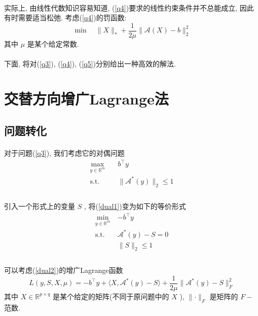 \documentclass[UTF8]{ctexart}
\newcommand{\equSplit}[1]{\begin{equation}\begin{split}#1\end{split}\end{equation}}
\newcommand{\equ}[1]{\begin{equation}#1\end{equation}}
\newcommand{\Tst}{\text{s.t.}\quad}
\newcommand{\norm}[1]{\lVert#1\rVert}
\newcommand{\inprod}[1]{\langle#1\rangle}
\newcommand{\Real}[1]{\mathbb{R}^{#1}}
\newcommand{\nunorm}{\norm{X}_*}
\newcommand{\Ma}{\mathcal{A}}
\numberwithin{equation}{section}
\begin{document}
			\paragraph{}
				\quad 实际上, 由线性代数知识容易知道, (\ref{q4})要求的线性约束条件并不总能成立, 因此有时需要适当松弛. 考虑(\ref{q4})的罚函数:
				\equ{\label{q5}
					\min \quad \nunorm+ \frac{1}{2\mu} \norm{\mathcal{A}(X) - b}_2^2
				}
				其中 $\mu$ 是某个给定常数.

			\paragraph{}
				\quad 下面, 将对(\ref{q3}), (\ref{q4}), (\ref{q5})分别给出一种高效的解法.

	\section{交替方向增广Lagrange法}
		\subsection{问题转化}
			\paragraph{}
				\quad 对于问题(\ref{q3}), 我们考虑它的对偶问题
				\equSplit{\label{dual1}
					\max_{y \in \Real{m}} \quad & b^\top y\\
					\Tst & \norm{\Ma^*(y)}_2 \le 1\\
				}

			\paragraph{}
				\quad 引入一个形式上的变量 $S$ , 将(\ref{dual1})变为如下的等价形式
				\equSplit{\label{dual2}
					\min_{y \in \Real{m}} & -b^\top y\\
					\Tst & \Ma^*(y) - S = 0\\
					&\norm{S}_2 \le 1\\
				}

			\paragraph{}
				\quad 可以考虑(\ref{dual2})的增广Lagrange函数
				\equ{\label{Lag}
					L(y, S, X, \mu) = -b^\top y + \inprod{X, \Ma^*(y) - S} + \frac{1}{2\mu} \norm{\Ma^*(y) - S}^2_F
				}
				其中 $X \in \Real{p \times q}$ 是某个给定的矩阵(不同于原问题中的 $X$ ), $\norm{\cdot}_F$ 是矩阵的 $F-$范数.
\end{document}

